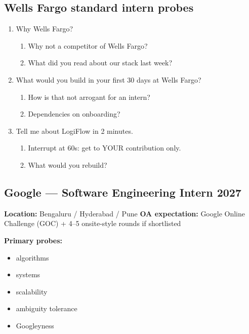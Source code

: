 \documentclass[9pt,a4paper]{article}
\begin{document}
\subsection{Wells Fargo standard intern probes}
\begin{enumerate}[label=\textbf{Q\arabic*:}, leftmargin=*]
  \item Why Wells Fargo?
  \begin{enumerate}[label=\textit{FU\arabic*:}, leftmargin=2em]
    \item Why not a competitor of Wells Fargo?
    \item What did you read about our stack last week?
  \end{enumerate}
  \item What would you build in your first 30 days at Wells Fargo?
  \begin{enumerate}[label=\textit{FU\arabic*:}, leftmargin=2em]
    \item How is that not arrogant for an intern?
    \item Dependencies on onboarding?
  \end{enumerate}
  \item Tell me about LogiFlow in 2 minutes.
  \begin{enumerate}[label=\textit{FU\arabic*:}, leftmargin=2em]
    \item Interrupt at 60s: get to YOUR contribution only.
    \item What would you rebuild?
  \end{enumerate}
\end{enumerate}
\newpage
\subsection{Google --- Software Engineering Intern 2027}
\textbf{Location:} Bengaluru / Hyderabad / Pune \quad \textbf{OA expectation:} Google Online Challenge (GOC) + 4--5 onsite-style rounds if shortlisted

\textbf{Primary probes:}
\begin{itemize}
  \item algorithms
  \item systems
  \item scalability
  \item ambiguity tolerance
  \item Googleyness
\end{itemize}
\end{document}
